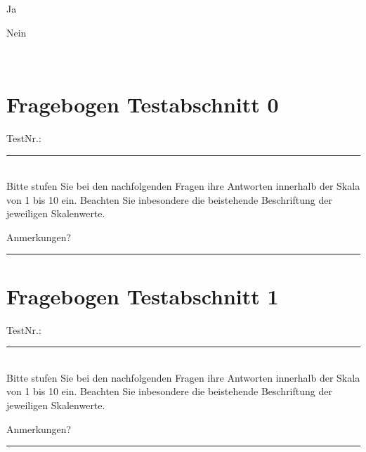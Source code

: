 \documentclass[12pt,fleqn]{scrreprt}
\begin{document}
\begin{longanswersB}
\item Ja
\item Nein
\end{longanswersB}


\vspace{0.75cm}
\line \\


\pagebreak
\section*{Fragebogen Testabschnitt 0 }
\line
TestNr.: \rule{1cm}{.1pt} \\



Bitte stufen Sie bei den nachfolgenden Fragen ihre Antworten innerhalb der Skala von 1 bis 10 ein.
Beachten Sie inbesondere die beistehende Beschriftung der jeweiligen Skalenwerte.


Anmerkungen? \rule{10cm}{.1pt}%













\pagebreak
\section*{Fragebogen Testabschnitt 1 }
\line
TestNr.: \rule{1cm}{.1pt} \\

Bitte stufen Sie bei den nachfolgenden Fragen ihre Antworten innerhalb der Skala von 1 bis 10 ein.
Beachten Sie inbesondere die beistehende Beschriftung der jeweiligen Skalenwerte.



Anmerkungen? \rule{10cm}{.1pt}%
\end{document}
